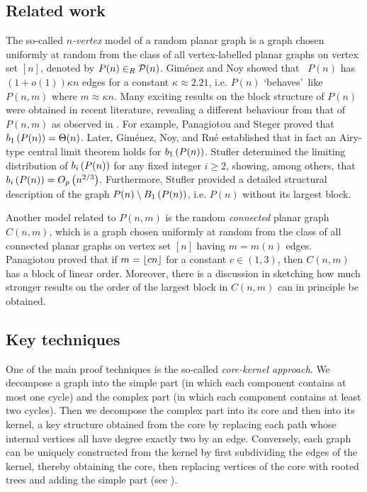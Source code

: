 \subsection{Related work}
The so-called {\em $n$-vertex} model of a random planar graph is a graph chosen uniformly at random from the class of all vertex-labelled planar graphs on vertex set $[n]$, denoted by $P(n)\in_R \mathcal{P}(n)$. Gim\'enez and Noy \cite{GimenezNoy2009} showed that \whp\ $P(n)$ has $\left(1+o(1)\right)\kappa n$ edges for a constant $\kappa\approx 2.21$, i.e. $P(n)$ \lq behaves\rq\ like $P(n,m)$ where $m\approx \kappa n$. Many exciting results on the block structure of $P(n)$ were obtained in recent literature, revealing a different behaviour from that of $P(n,m)$ as observed in . For example, Panagiotou and Steger \cite{PanagiotouSteger2010} proved that \whp\ $b_{1}\left(P(n)\right)=\Theta(n)$. Later, Gim\'{e}nez, Noy, and Ru\'{e} \cite[Proposition 5.3]{GimenezNoyRue2013} established that in fact an Airy-type central limit theorem holds for $b_{1}\left(P(n)\right)$. Stufler \cite[Theorem 6.20, Corollary 6.42]{Stufler2020} determined the limiting distribution of $b_{i}\left(P(n)\right)$ for any fixed integer $i\geq 2$, showing, among others, that $b_{i}\left(P(n)\right)=O_p\left(n^{2/3}\right)$. Furthermore, Stufler \cite[Remark 9.13]{StuflerAppear} provided a detailed structural description of the graph $P(n)\setminus B_{1}\left(P(n)\right)$, i.e. $P(n)$ without its largest block.

Another model related to $P(n,m)$ is the random {\em connected} planar graph $C(n,m)$, which is a graph chosen uniformly at random from the class of all connected planar graphs on vertex set $[n]$ having $m=m(n)$ edges. Panagiotou \cite[Theorem 1, Corollary 1]{Panagiotou2009} proved that if $m=\left\lfloor cn\right\rfloor$ for a constant $c\in (1,3)$, then $C(n,m)$ has a block of linear order. Moreover, there is a discussion in \cite[End of Section 5]{GimenezNoyRue2013} sketching how much stronger results on the order of the largest block in $C(n,m)$ can in principle be obtained.

\subsection{Key techniques}
One of the main proof techniques is the so-called {\em core-kernel approach}. We decompose a graph into the simple part (in which each component contains at most one cycle) and the complex part (in which each component contains at least two cycles). Then we decompose the complex part into its core and then into its kernel, a key structure obtained from the core by replacing each path whose internal vertices all have degree exactly two by an edge. Conversely, each graph can be uniquely constructed from the kernel by first subdividing the edges of the kernel, thereby obtaining the core, then replacing vertices of the core with rooted trees and adding the simple part (see ).

